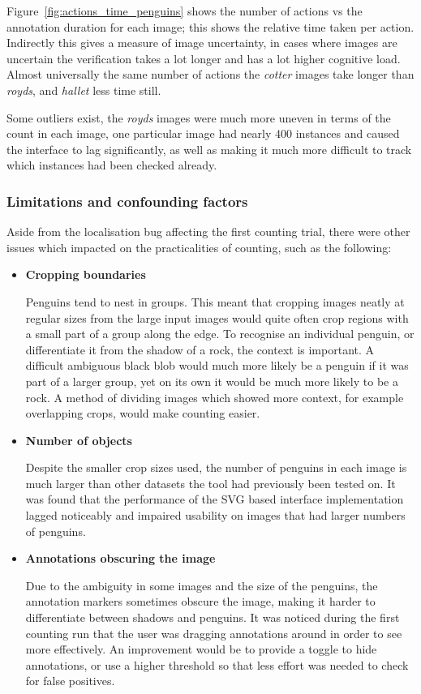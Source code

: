 Figure~\ref{fig:actions_time_penguins} shows the number of actions vs the annotation duration for each image; this shows the relative time taken per action. Indirectly this gives a measure of image uncertainty, in cases where images are uncertain the verification takes a lot longer and has a lot higher cognitive load. Almost universally the same number of actions the \emph{cotter} images take longer than \emph{royds}, and \emph{hallet} less time still. 

Some outliers exist, the \emph{royds} images were much more uneven in terms of the count in each image, one particular image had nearly $400$ instances and caused the interface to lag significantly, as well as making it much more difficult to track which instances had been checked already.


\subsubsection{Limitations and confounding factors}

Aside from the localisation bug affecting the first counting trial, there were other issues which impacted on the practicalities of  counting, such as the following:
\begin{itemize}
    \item {\textbf{Cropping boundaries}}\par
Penguins tend to nest in groups. This meant that cropping images neatly at regular sizes from the large input images would quite often crop regions with a small part of a group along the edge. To recognise an individual penguin, or differentiate it from the shadow of a rock, the context is important. A difficult ambiguous black blob would much more likely be a penguin if it was part of a larger group, yet on its own it would be much more likely to be a rock. A method of dividing images which showed more context, for example overlapping crops, would make counting easier.
    \item {\textbf{Number of objects}}\par
Despite the smaller crop sizes used, the number of penguins in each image is much larger than other datasets the tool had previously been tested on. It was found that the performance of the \gls{SVG} based interface implementation lagged noticeably and impaired usability on images that had larger numbers of penguins. 
    \item {\textbf{Annotations obscuring the image}}\par
Due to the ambiguity in some images and the size of the penguins,  the annotation markers sometimes obscure the image, making it harder to differentiate between shadows and penguins. It was noticed during the first counting run that the user was dragging annotations around in order to see more effectively. An improvement would be to provide a toggle to hide annotations, or use a higher threshold so that less effort was needed to check for false positives.

\end{itemize}



